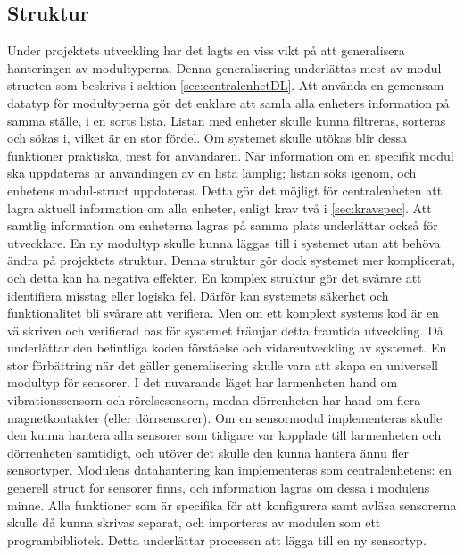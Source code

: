 \subsection{Struktur}
\label{sec:structfunc}
Under projektets utveckling har det lagts en viss vikt på att generalisera hanteringen av modultyperna. Denna generalisering underlättas mest av modul-structen som beskrivs i sektion \ref{sec:centralenhetDL}. Att använda en gemensam datatyp för modultyperna gör det enklare att samla alla enheters information på samma ställe, i en sorts lista. Listan med enheter skulle kunna filtreras, sorteras och sökas i, vilket är en stor fördel. Om systemet skulle utökas blir dessa funktioner praktiska, mest för användaren. 
\newline \newline 
När information om en specifik modul ska uppdateras är användingen av en lista lämplig; listan söks igenom, och enhetens modul-struct uppdateras. Detta gör det möjligt för centralenheten att lagra aktuell information om alla enheter, enligt krav två i \ref{sec:kravspec}. Att samtlig information om enheterna lagras på samma plats underlättar också för utvecklare. En ny modultyp skulle kunna läggas till i systemet utan att behöva ändra på projektets struktur.
\newline \newline
Denna struktur gör dock systemet mer komplicerat, och detta kan ha negativa effekter. En komplex struktur gör det svårare att identifiera misstag eller logiska fel. Därför kan systemets säkerhet och funktionalitet bli svårare att verifiera. Men om ett komplext systems kod är en välskriven och verifierad bas för systemet främjar detta framtida utveckling. Då underlättar den befintliga koden förståelse och vidareutveckling av systemet.
\newline \newline 
En stor förbättring när det gäller generalisering skulle vara att skapa en universell modultyp för sensorer. I det nuvarande läget har larmenheten hand om vibrationssensorn och rörelsesensorn, medan dörrenheten har hand om flera magnetkontakter (eller dörrsensorer). Om en sensormodul implementeras skulle den kunna hantera alla sensorer som tidigare var kopplade till larmenheten och dörrenheten samtidigt, och utöver det skulle den kunna hantera ännu fler sensortyper. Modulens datahantering kan implementeras som centralenhetens: en generell struct för sensorer finns, och information lagras om dessa i modulens minne. Alla funktioner som är specifika för att konfigurera samt avläsa sensorerna skulle då kunna skrivas separat, och importeras av modulen som ett programbibliotek. Detta underlättar processen att lägga till en ny sensortyp.

